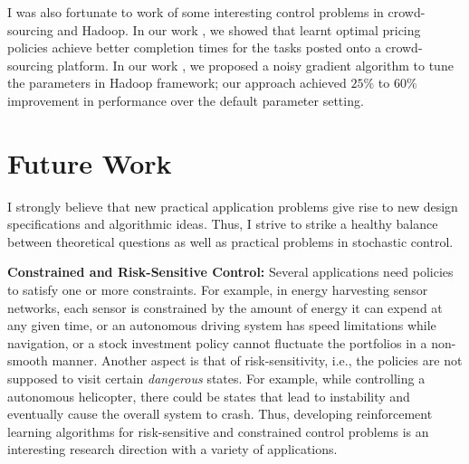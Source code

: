 \documentclass[onecolumn,12pt]{IEEEtran}
\begin{document}
I was also fortunate to work of some interesting control problems in crowd-sourcing and Hadoop. In our work \cite{hcomp}, we showed that learnt optimal pricing policies achieve better completion times for the tasks posted onto a crowd-sourcing platform. In our work \cite{hadoop}, we proposed a noisy gradient algorithm to tune the parameters in Hadoop framework; our approach achieved $25\%$ to $60\%$ improvement in performance over the default parameter setting.



\section{Future Work}\label{future}
 I strongly believe that new practical application problems give rise to new design specifications and algorithmic ideas. Thus, I strive to strike a healthy balance between theoretical questions as well as practical problems in stochastic control.
 
 \textbf{Constrained and Risk-Sensitive Control:} Several applications need policies to satisfy one or more constraints. For example, in energy harvesting sensor networks, each sensor is constrained by the amount of energy it can expend at any given time, or an autonomous driving system has speed limitations while navigation, or a stock investment policy cannot fluctuate the portfolios in a non-smooth manner. Another aspect is that of risk-sensitivity, i.e., the policies are not supposed to visit certain \emph{dangerous} states. For example, while controlling a autonomous helicopter, there could be states that lead to instability and eventually cause the overall system to crash. Thus, developing reinforcement learning algorithms for risk-sensitive and constrained control problems is an interesting research direction with a variety of applications.
 
\end{document}
